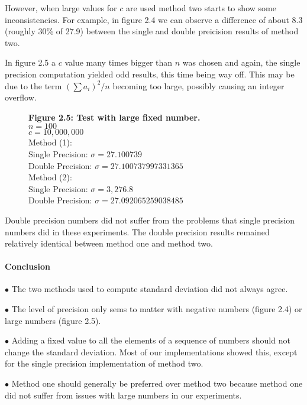 \documentclass[12pt]{article}
\begin{document}
However, when large values for $c$ are used method two starts to show some inconsistencies. For example, in figure 2.4 we can observe a difference of about 8.3 (roughly 30\% of 27.9) between the single and double preicision results of method two. 

In figure 2.5 a $c$ value many times bigger than $n$ was chosen and again, the single precision computation yielded odd results, this time being way off. This may be due to the term $(\sum a_{i})^2/n$ becoming too large, possibly causing an integer overflow.

\begin{figure}[h]
	\textbf{Figure 2.5: Test with large fixed number.}\\
	$n=100$\\
	$c=10,000,000$\\
	
	Method (1):\\
	Single Precision: $\sigma=27.100739$\\
	Double Precision: $\sigma=27.100737997331365$\\
	
	Method (2):\\
	Single Precision: $\sigma=3,276.8$\\
	Double Precision: $\sigma=27.092065259038485$
\end{figure}

Double precision numbers did not suffer from the problems that single precision numbers did in these experiments. The double precision results remained relatively identical between method one and method two.

\paragraph{Conclusion}
$\bullet$ The two methods used to compute standard deviation did not always agree.

$\bullet$ The level of precision only sems to matter with negative numbers (figure 2.4) or large numbers (figure 2.5).

$\bullet$ Adding a fixed value to all the elements of a sequence of numbers should not change the standard deviation. Most of our implementations showed this, except for the single precision implementation of method two.

$\bullet$ Method one should generally be preferred over method two because method one did not suffer from issues with large numbers in our experiments.
\end{document}
